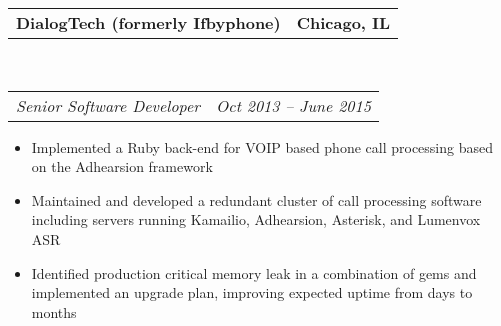 \documentclass[10pt,letterpaper]{article}
\makeatletter
\newcommand{\headerrow}[2]
{\begin{tabular*}{\linewidth}{l@{\extracolsep{\fill}}r}
	#1 &
	#2 \\
\end{tabular*}}
\newenvironment{indentsection}[1]%
{\begin{list}{}%
	{\setlength{\leftmargin}{#1}}%
	\item[]%
}
{\end{list}}
\makeatother
\begin{document}
\begin{indentsection}{\parindent}
	\headerrow
		{\textbf{DialogTech (formerly Ifbyphone)} }
		{\textbf{Chicago, IL}}
	\\
	\headerrow
		{\emph{Senior Software Developer}}
		{\emph{Oct 2013 -- June 2015}}

	\begin{itemize}
	\renewcommand{\labelitemi}{$-$}
	\vspace{-0.1in}
    \item Implemented a Ruby back-end for VOIP based phone call processing based on the Adhearsion framework
    \item Maintained and developed a redundant cluster of call processing software including servers running Kamailio, Adhearsion, Asterisk, and Lumenvox ASR
    \item Identified production critical memory leak in a combination of gems and implemented an upgrade plan, improving expected uptime from days to months
	\end{itemize}
\end{indentsection}
\end{document}
